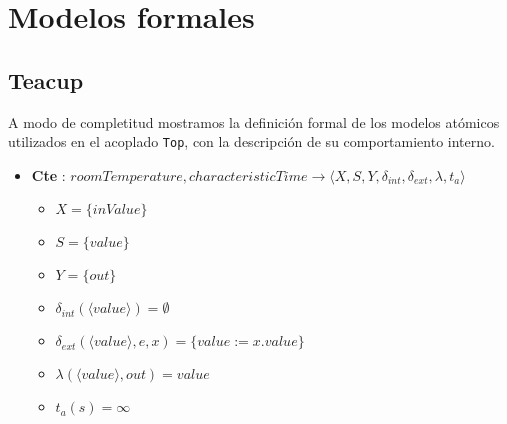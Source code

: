 \section{Modelos formales}
\subsection{Teacup}
A modo de completitud mostramos la definición formal de los modelos atómicos 
utilizados en el acoplado \texttt{Top}, con la descripción de su comportamiento interno.
\begin{itemize}
	
	\item \textbf{Cte} : $ roomTemperature, characteristicTime \rightarrow \langle X, S, Y, \delta_{int}, \delta_{ext}, \lambda, t_{a} \rangle$ \newline
	\begin{itemize}
		\item $ X = \{ inValue \} $ \newline
		\item $ S = \{ value \} $ \newline
		\item $ Y = \{ out \} $ \newline
		\item $ \delta_{int}(\langle value \rangle) = \emptyset $ \newline
		\item $ \delta_{ext} (\langle value \rangle, e, x)= \{ value := x.value \} $ \newline
		\item $ \lambda(\langle value \rangle, out) = value $ \newline
		\item $ t_{a}(s) = \infty $ 
	\end{itemize}
	

\end{itemize}
